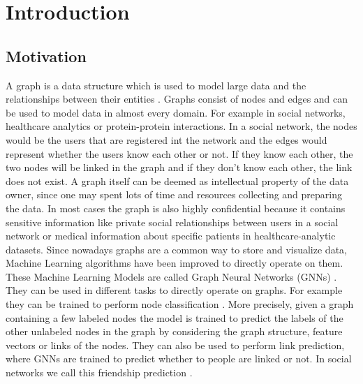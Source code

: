 \chapter{Introduction}


	\section{Motivation}

		A graph is a data structure which is used to model large data and the relationships between their entities \cite{DBLP:journals/corr/abs-2005-00687, cook2006mining}.
		Graphs consist of nodes and edges and can be used to model data in almost every domain.
		For example in social networks, healthcare analytics or protein-protein interactions.
		In a social network, the nodes would be the users that are registered int the network and the edges would represent whether the users know each other or not.
		If they know each other, the two nodes will be linked in the graph and if they don't know each other, the link does not exist.
		A graph itself can be deemed as intellectual property of the data owner, since one may spent lots of time and resources collecting and preparing the data.
		In most cases the graph is also highly confidential because it contains sensitive information like private social relationships between users in a social network or medical information about specific patients in healthcare-analytic datasets.
		Since nowadays graphs are a common way to store and visualize data, Machine Learning algorithms have been improved to directly operate on them.
		These Machine Learning Models are called Graph Neural Networks (GNNs) \cite{atwood2016diffusionconvolutional, defferrard2017convolutional}.
		They can be used in different tasks to directly operate on graphs.
		For example they can be trained to perform node classification \cite{kipf2017semisupervised}.
		More precisely, given a graph containing a few labeled nodes the model is trained to predict the labels of the other unlabeled nodes in the graph by considering the graph structure, feature vectors or links of the nodes.
		They can also be used to perform link prediction, where GNNs are trained to predict whether to people are linked or not.
		In social networks we call this friendship prediction \cite{zhang2018link}.

